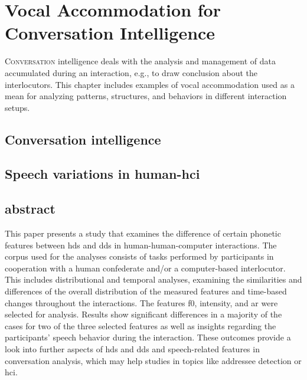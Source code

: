 \chapter{Vocal Accommodation for Conversation Intelligence}
\label{chap:conv_analysis}

\lettrine{C}{onversation} intelligence deals with the analysis and management of data accumulated during an interaction, e.g., to draw conclusion about the interlocutors.
This chapter includes examples of vocal accommodation used as a mean for analyzing patterns, structures, and behaviors in different interaction setups.

\pagebreak

\section{Conversation intelligence}
\label{sec:conversation_intelligence}


\citet{Glaser2016conversational}
\citet{SilberVarod2018human}

\section{Speech variations in human-\acl{hci}}
\label{sec:speech_variations_in_hhci}


\section{abstract}

This paper presents a study that examines the difference of certain phonetic features between \ac{hds} and \ac{dds} in human-human-computer interactions.
The corpus used for the analyses consists of tasks performed by participants in cooperation with a human confederate and/or a computer-based interlocutor.
This includes distributional and temporal analyses, examining the similarities and differences of the overall distribution of the measured features and time-based changes throughout the interactions. 
The features \acl{f0}, intensity, and \acl{ar} were selected for analysis.
Results show significant differences in a majority of the cases for two of the three selected features as well as insights regarding the participants' speech behavior during the interaction.
These outcomes provide a look into further aspects of \ac{hds} and \ac{dds} and speech-related features in conversation analysis, which may help studies in topics like addressee detection or \ac{hci}.

